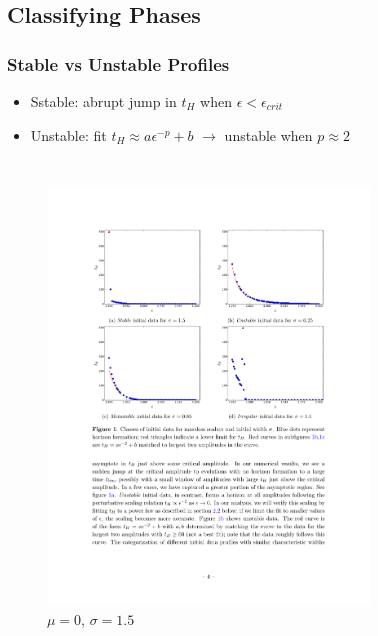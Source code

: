\documentclass[mathserif,10pt]{beamer}
\newcommand{\bi}{\begin{itemize}}
\newcommand{\ei}{\end{itemize}}
\newcommand{\its}{\item}
\begin{document}
\subsection{Classifying Phases}
\frame
{
  \frametitle{Stable vs Unstable Profiles}
  \bi
  \its Sstable: abrupt jump in $t_H$ when $\epsilon < \epsilon_{crit}$
  \its<2->{Unstable: fit $t_H \approx a \epsilon^{-p} + b$ $\to$ unstable when $p \approx 2$}
  \ei
  \begin{columns}
    \begin{figure}
    \centering
    \includegraphics[scale=0.75]{m0w15} \\ $\mu =0$, $\sigma =1.5$
    \end{figure}
    \begin{figure}
    \centering

\end{figure}
\end{columns}}
\end{document}
